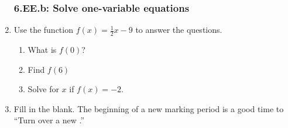 \documentclass[12pt, twoside]{article}
\begin{document}
\begin{enumerate}
\subsubsection*{6.EE.b: Solve one-variable equations}
\item Use the function $f(x) = \frac{1}{2}x-9$ to answer the questions.
    \begin{multicols}{2}
    \begin{enumerate}[itemsep=2cm]
        \item What is $f(0)$?
        \item Find $f(6)$
        \item Solve for $x$ if $f(x) = -2$.
    \end{enumerate}
    \end{multicols} \vspace{3cm}

\item Fill in the blank. The beginning of a new marking period is a good time to\\[0.5cm] 
``Turn over a new \underline{\hspace{2cm}}.''

\end{enumerate}
\end{document}
